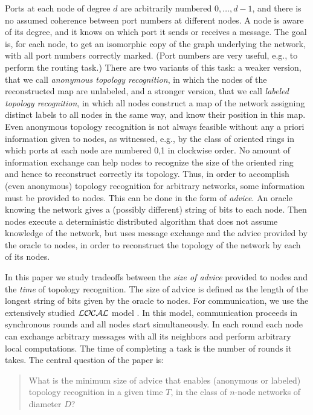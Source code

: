 \documentclass{article}
\begin{document}
 Ports at each node of degree $d$ are 
arbitrarily numbered $0, \dots,d-1$, and there is no assumed coherence between port numbers at different nodes. A node is aware of its degree, and it knows on which port it sends or receives a message. 
The goal is, for each node, to get an isomorphic copy of the graph underlying the
network, with all port numbers correctly  marked. (Port numbers are very useful, e.g., to perform the routing task.)
There are two variants of this task:
a weaker version, that we call
{\em anonymous topology recognition}, in which the nodes of the reconstructed map are unlabeled,
and a stronger version, that we call {\em labeled topology recognition}, in which all nodes construct 
a map of the network assigning distinct labels to all nodes in the same way, and know their position in this map.
Even anonymous topology recognition is not always feasible without any a priori information given to nodes, as witnessed, e.g.,  by the class
of oriented rings in which ports at each node are numbered 0,1 in clockwise order. No amount of information exchange can help nodes to recognize the size of the oriented ring and hence to reconstruct
correctly its topology. Thus, in order to accomplish (even anonymous) topology recognition for arbitrary networks, some information must be provided to nodes. This can be done in the form of {\em advice}. An oracle knowing the network gives a (possibly different) string of bits to each node. Then nodes execute
a deterministic distributed algorithm that does not assume knowledge of the network, but uses message exchange and the advice provided
by the oracle to nodes, in order to reconstruct the topology of the network by each of its nodes. 

In this paper we study tradeoffs between the {\em size of advice} provided to nodes and the {\em time} of topology recognition. The size of advice is defined as the length of the longest string of bits
given by the oracle to nodes. For communication,
we use the extensively studied ${\cal LOCAL}$ model  \cite{Pe}. 
In this model, communication proceeds in synchronous rounds
and all nodes start simultaneously. In each round each node
can exchange arbitrary messages with all its neighbors and perform arbitrary local computations. 
The time of completing a task is the number of rounds it takes. 
The central question of the paper is:

\begin{quotation}
What is the minimum size of advice that enables (anonymous or labeled) topology recognition in a given time $T$,
in the class of $n$-node networks of diameter $D$?
\end{quotation}
\end{document}

